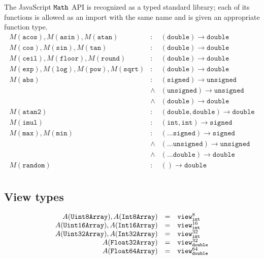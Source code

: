 \documentclass{article}
\newcommand{\funty}[2]{({#1}) \rightarrow {#2}}
\newcommand{\mathjs}[1]{\mbox{\texttt{{#1}}}}
\newcommand{\mathjssm}[1]{\mbox{\texttt{\scriptsize {#1}}}}
\newcommand{\unsigned}{\mathtt{unsigned}}
\newcommand{\intsm}{\mathjssm{int}}
\newcommand{\doublesm}{\mathjssm{double}}
\newcommand{\signed}{\mathtt{signed}}
\newcommand{\double}{\mathtt{double}}
\newcommand{\view}[2]{\mathtt{view}^{#1}_{#2}}
\renewcommand{\int}{\mathtt{int}}
\newcommand{\imul}{\mathtt{imul}}
\begin{document}
The JavaScript $\mathjs{Math}$ API is recognized as a typed standard
library; each of its functions is allowed as an import with the same
name and is given an appropriate function type.
\[
\begin{array}{rcl}
M(\mathtt{acos}), M(\mathtt{asin}), M(\mathtt{atan})                & : & \funty{\double}{\double} \\
M(\mathtt{cos}), M(\mathtt{sin}), M(\mathtt{tan})                   & : & \funty{\double}{\double} \\
M(\mathtt{ceil}), M(\mathtt{floor}), M(\mathtt{round})              & : & \funty{\double}{\double} \\
M(\mathtt{exp}), M(\mathtt{log}), M(\mathtt{pow}), M(\mathtt{sqrt}) & : & \funty{\double}{\double} \\
M(\mathtt{abs}) & :     & \funty{\signed}{\unsigned} \\
                & \land & \funty{\unsigned}{\unsigned} \\
                & \land & \funty{\double}{\double} \\
M(\mathtt{atan2}) & : & \funty{\double, \double}{\double} \\
M(\imul) & : & \funty{\int, \int}{\signed} \\
M(\mathtt{max}), M(\mathtt{min}) & :     & \funty{\ldots\signed}{\signed} \\
                                 & \land & \funty{\ldots\unsigned}{\unsigned} \\
                                 & \land & \funty{\ldots\double}{\double} \\
M(\mathtt{random}) & : & \funty{}{\double} \\
\end{array}
\]

\subsection{View types}

\[
\begin{array}{rcl}
A(\mathtt{Uint8Array}), A(\mathtt{Int8Array})   & = & \view{8}{\intsm} \\
A(\mathtt{Uint16Array}), A(\mathtt{Int16Array}) & = & \view{16}{\intsm} \\
A(\mathtt{Uint32Array}), A(\mathtt{Int32Array}) & = & \view{32}{\intsm} \\
A(\mathtt{Float32Array})                        & = & \view{32}{\doublesm} \\
A(\mathtt{Float64Array})                        & = & \view{64}{\doublesm} \\
\end{array}
\]
\end{document}
